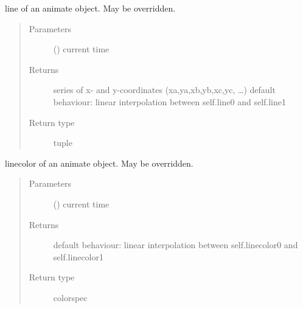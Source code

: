 \documentclass[letterpaper,10pt,english]{sphinxmanual}
\begin{document}
\begin{fulllineitems}

\begin{fulllineitems}
\label{\detokenize{Reference:salabim.Animate.line}}
line of an animate object. May be overridden.
\begin{quote}\begin{description}
\item[{Parameters}] \leavevmode
{} () \textendash{} current time

\item[{Returns}] \leavevmode
{} \textendash{} series of x- and y-coordinates (xa,ya,xb,yb,xc,yc, …) 
default behaviour: linear interpolation between self.line0 and self.line1

\item[{Return type}] \leavevmode
tuple

\end{description}\end{quote}

\end{fulllineitems}


\begin{fulllineitems}
\label{\detokenize{Reference:salabim.Animate.linecolor}}
linecolor of an animate object. May be overridden.
\begin{quote}\begin{description}
\item[{Parameters}] \leavevmode
{} () \textendash{} current time

\item[{Returns}] \leavevmode
{} \textendash{} default behaviour: linear interpolation between self.linecolor0 and self.linecolor1

\item[{Return type}] \leavevmode
colorspec

\end{description}\end{quote}

\end{fulllineitems}


\end{fulllineitems}
\end{document}
